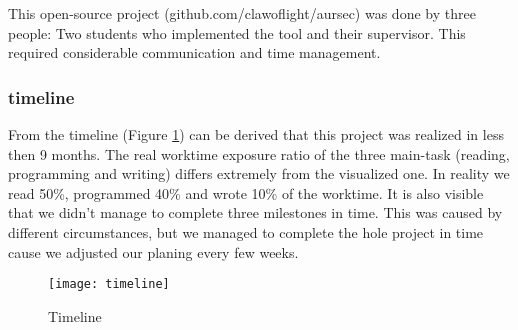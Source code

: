 This open-source project (github.com/clawoflight/aursec) was done by three people: Two students who implemented the tool and their supervisor. This required considerable communication and time management. 

\subsubsection*{timeline}
From the timeline (Figure \ref{fig:timeline}) can be derived that this project was realized in less then 9 months. The real worktime exposure ratio of the three main-task (reading, programming and writing) differs extremely from the visualized one. In reality we read 50\%, programmed 40\% and wrote 10\% of the worktime.
It is also visible that we didn't manage to complete three milestones in time. This was caused by different circumstances, but we managed to complete the hole project in time cause we adjusted our planing every few weeks.

\begin{figure}[!htb]
	\centering
		\texttt{[image: timeline]}
	\caption{Timeline}
	\label{fig:timeline}
\end{figure}
